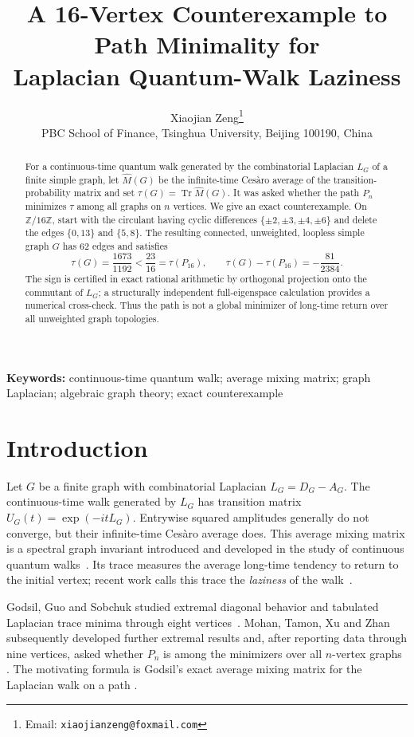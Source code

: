 \documentclass[11pt]{article}
\title{A 16-Vertex Counterexample to Path Minimality for\\
Laplacian Quantum-Walk Laziness}
\author{Xiaojian Zeng\thanks{Email: \texttt{xiaojianzeng@foxmail.com}}\\
PBC School of Finance, Tsinghua University, Beijing 100190, China}
\date{}
\newcommand{\Mhat}{\widehat M}
\newcommand{\Z}{\mathbb{Z}}
\newcommand{\Tr}{\operatorname{Tr}}
\begin{document}
\maketitle

\begin{abstract}
For a continuous-time quantum walk generated by the combinatorial Laplacian
$L_G$ of a finite simple graph, let $\Mhat(G)$ be the infinite-time Ces\`aro
average of the transition-probability matrix and set
$\tau(G)=\Tr\Mhat(G)$.  It was asked whether the path $P_n$ minimizes
$\tau$ among all graphs on $n$ vertices.  We give an exact counterexample.
On $\Z/16\Z$, start with the circulant having cyclic differences
$\{\pm2,\pm3,\pm4,\pm6\}$ and delete the edges $\{0,13\}$ and
$\{5,8\}$.  The resulting connected, unweighted, loopless simple graph $G$
has 62 edges and satisfies
\[
  \tau(G)=\frac{1673}{1192}
  <\frac{23}{16}=\tau(P_{16}),
  \qquad
  \tau(G)-\tau(P_{16})=-\frac{81}{2384}.
\]
The sign is certified in exact rational arithmetic by orthogonal projection
onto the commutant of $L_G$; a structurally independent full-eigenspace
calculation provides a numerical cross-check.  Thus the path is not a global
minimizer of long-time return over all unweighted graph topologies.
\end{abstract}

\noindent\textbf{Keywords:} continuous-time quantum walk; average mixing
matrix; graph Laplacian; algebraic graph theory; exact counterexample

\section{Introduction}

Let $G$ be a finite graph with combinatorial Laplacian $L_G=D_G-A_G$.
The continuous-time walk generated by $L_G$ has transition matrix
$U_G(t)=\exp(-itL_G)$.  Entrywise squared amplitudes generally do not
converge, but their infinite-time Ces\`aro average does.  This average mixing
matrix is a spectral graph invariant introduced and developed in the study
of continuous quantum walks~\cite{Godsil2013}.  Its trace measures the
average long-time tendency to return to the initial vertex; recent work calls
this trace the \emph{laziness} of the walk~\cite{MohanTamonXuZhan2026}.

Godsil, Guo and Sobchuk studied extremal diagonal behavior and tabulated
Laplacian trace minima through eight vertices~\cite{GodsilGuoSobchuk2023}.
Mohan, Tamon, Xu and Zhan subsequently developed further extremal results and,
after reporting data through nine vertices, asked whether $P_n$ is among the
minimizers over all $n$-vertex graphs
\cite[Section~8(ii)]{MohanTamonXuZhan2026}.  The motivating formula is
Godsil's exact average mixing matrix for the Laplacian walk on a path
\cite[Theorem~5.3]{Godsil2013}.
\end{document}
